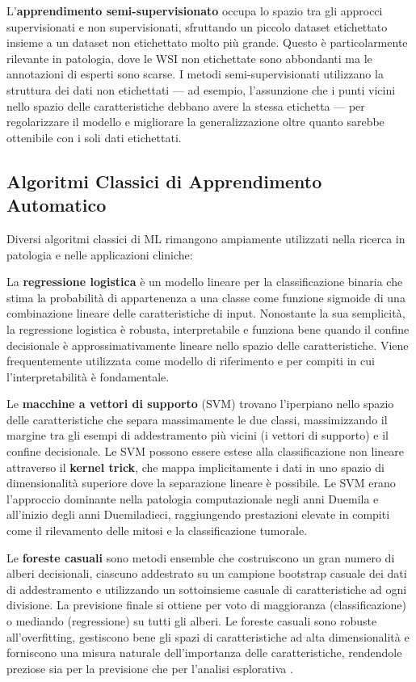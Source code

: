L'\textbf{apprendimento semi-supervisionato} occupa lo spazio tra gli approcci supervisionati e non supervisionati, sfruttando un piccolo dataset etichettato insieme a un dataset non etichettato molto più grande. Questo è particolarmente rilevante in patologia, dove le WSI non etichettate sono abbondanti ma le annotazioni di esperti sono scarse. I metodi semi-supervisionati utilizzano la struttura dei dati non etichettati — ad esempio, l'assunzione che i punti vicini nello spazio delle caratteristiche debbano avere la stessa etichetta — per regolarizzare il modello e migliorare la generalizzazione oltre quanto sarebbe ottenibile con i soli dati etichettati.

\subsection{Algoritmi Classici di Apprendimento Automatico}

Diversi algoritmi classici di ML rimangono ampiamente utilizzati nella ricerca in patologia e nelle applicazioni cliniche:

La \textbf{regressione logistica} è un modello lineare per la classificazione binaria che stima la probabilità di appartenenza a una classe come funzione sigmoide di una combinazione lineare delle caratteristiche di input. Nonostante la sua semplicità, la regressione logistica è robusta, interpretabile e funziona bene quando il confine decisionale è approssimativamente lineare nello spazio delle caratteristiche. Viene frequentemente utilizzata come modello di riferimento e per compiti in cui l'interpretabilità è fondamentale.

Le \textbf{macchine a vettori di supporto} (SVM) trovano l'iperpiano nello spazio delle caratteristiche che separa massimamente le due classi, massimizzando il margine tra gli esempi di addestramento più vicini (i vettori di supporto) e il confine decisionale. Le SVM possono essere estese alla classificazione non lineare attraverso il \textbf{kernel trick}, che mappa implicitamente i dati in uno spazio di dimensionalità superiore dove la separazione lineare è possibile. Le SVM erano l'approccio dominante nella patologia computazionale negli anni Duemila e all'inizio degli anni Duemiladieci, raggiungendo prestazioni elevate in compiti come il rilevamento delle mitosi e la classificazione tumorale.

Le \textbf{foreste casuali} sono metodi ensemble che costruiscono un gran numero di alberi decisionali, ciascuno addestrato su un campione bootstrap casuale dei dati di addestramento e utilizzando un sottoinsieme casuale di caratteristiche ad ogni divisione. La previsione finale si ottiene per voto di maggioranza (classificazione) o mediando (regressione) su tutti gli alberi. Le foreste casuali sono robuste all'overfitting, gestiscono bene gli spazi di caratteristiche ad alta dimensionalità e forniscono una misura naturale dell'importanza delle caratteristiche, rendendole preziose sia per la previsione che per l'analisi esplorativa \cite{rashidi2019}.

